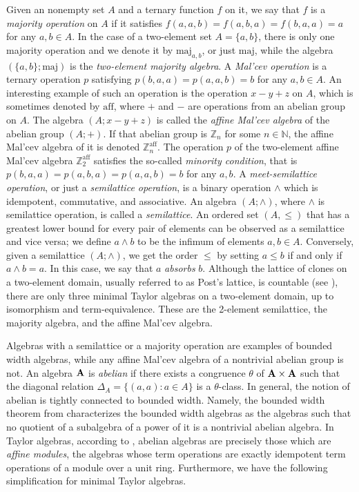 \documentclass[11pt]{amsart}
\newcommand{\m}[1]{\mathbf{\uppercase{#1}}}
\theoremstyle{definition}
\theoremstyle{remark}
\theoremstyle{plain}
\begin{document}
Given an nonempty set $A$ and a ternary function $f$ on it, we say that $f$ is a \emph{majority operation} on $A$ if it satisfies $f(a,a,b)=f(a,b,a)=f(b,a,a)=a$ for any $a,b\in A$. In the case of a two-element set $A=\{a,b\}$, there is only one majority operation and we denote it by $\mathrm{maj}_{a,b}$, or just $\mathrm{maj}$, while the algebra $(\{a,b\};\mathrm{maj})$ is the \emph{two-element majority algebra}. A \emph{Mal'cev operation} is a ternary operation $p$ satisfying $p(b,a,a)=p(a,a,b)=b$ for any $a,b\in A$. An interesting example of such an operation is the operation $x-y+z$ on $A$, which is sometimes denoted by $\mathrm{aff}$, where $+$ and $-$ are operations from an abelian group on $A$. The algebra $(A;x-y+z)$ is called the \emph{affine Mal'cev algebra} of the abelian group $(A;+)$. If that abelian group is $\mathbb{Z}_n$ for some $n\in\mathbb{N}$, the affine Mal'cev algebra of it is denoted $\mathbb{Z}_n^{\mathrm{aff}}$. The operation $p$ of the two-element affine Mal'cev algebra $\mathbb{Z}_2^{\mathrm{aff}}$ satisfies the so-called \emph{minority condition}, that is $p(b,a,a)=p(a,b,a)=p(a,a,b)=b$ for any $a,b$.  A \emph{meet-semilattice operation}, or just a \emph{semilattice operation}, is a binary operation $\wedge$ which is idempotent, commutative, and associative. An algebra $(A;\wedge)$, where $\wedge$ is semilattice operation, is called a \emph{semilattice}. An ordered set $(A,\leqslant)$ that has a greatest lower bound for every pair of elements can be observed as a semilattice and vice versa; we define $a\wedge b$ to be the infimum of elements $a,b\in A$. Conversely, given a semilattice $(A;\wedge)$, we get the order $\leqslant$ by setting $a\leqslant b$ if and only if $a\wedge b=a$. In this case, we say that $a$ \emph{absorbs} $b$.  Although the lattice of clones on a two-element domain, usually referred to as Post's lattice, is countable (see \cite{post}), there are only three minimal Taylor algebras on a two-element domain, up to isomorphism and term-equivalence. These are the 2-element semilattice, the majority algebra, and the affine Mal'cev algebra.

Algebras with a semilattice or a majority operation are examples of bounded width algebras, while any affine Mal'cev algebra of a nontrivial abelian group is not. An algebra $\m a$ is \emph{abelian} if there exists a congruence $\theta$ of $\m a \times \m a$ such that the diagonal relation $\Delta _{A}=\{(a,a)\colon a\in A\}$ is a $\theta$-class. In general, the notion of abelian is tightly connected to bounded width. Namely, the bounded width theorem from \cite{bkbw} characterizes the bounded width algebras as the algebras such that no quotient of a subalgebra of a power of it is a nontrivial abelian algebra. In Taylor algebras, according to  \cite{hobby-mckenzie}, abelian algebras are precisely those which are \emph{affine modules}, the algebras whose term operations are exactly idempotent term operations of a module over a unit ring. Furthermore, we have the following simplification for minimal Taylor algebras.
\end{document}
